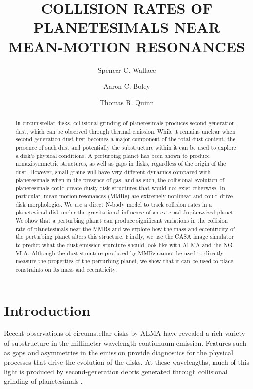 \documentclass[onecolumn]{aastex63}
\begin{document}
\title{COLLISION RATES OF PLANETESIMALS NEAR MEAN-MOTION RESONANCES}

\author{Spencer C. Wallace}

\author{Aaron C. Boley}

\author{Thomas R. Quinn}

\begin{abstract}
In circumstellar disks, collisional grinding of planetesimals produces second-generation dust, which can be observed through thermal 
emission. While it remains unclear when second-generation dust first becomes a major component of the total dust content, the presence of 
such dust and potentially the substructure within it can be used to explore a disk's physical conditions. A perturbing planet has been shown to 
produce nonaxisymmetric structures, as well as gaps in disks, regardless of the origin of the dust. However, small grains will have very 
different dynamics compared with planetesimals when in the presence of gas, and as such, the collisional evolution of planetesimals could 
create dusty disk structures that would not exist otherwise. In particular, mean motion resonances (MMRs) are extremely nonlinear and could 
drive disk morphologies. We use a direct N-body model to track collision rates in a planetesimal disk under the gravitational influence of an 
external Jupiter-sized planet. We show that a perturbing planet can produce significant variations in the collision rate of planetesimals near the 
MMRs and we explore how the mass and eccentricity of the perturbing planet alters this structure. Finally, we use the CASA image simulator to 
predict what the dust emission sturcture should look like with ALMA and the NG-VLA. Although the dust structure produced by MMRs cannot 
be used to directly measure the properties of the perturbing planet, we show that it can be used to place constraints on its mass and 
eccentricity.
\end{abstract}

\section{Introduction} \label{sec:intro}

Recent observations of circumstellar disks by ALMA have revealed a rich variety of substructure in the millimeter wavelength
contiunuum emission. Features such as gaps and asymmetries 
\citep{2015ApJ...808L...3A, 2016Sci...353.1519P, PhysRevLett.117.251101, 2016ApJ...820L..40A, 2016Natur.535..258C} in the 
emission provide diagnostics for the physical processes that drive the evolution of the disks. At these wavelengths, much of this light 
is produced by second-generation debris generated through collisional grinding of planetesimals
\citep[see][]{2008ARA&A..46..339W}. 
\end{document}
